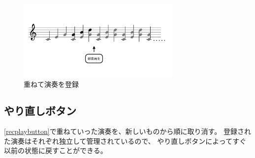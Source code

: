\begin{figure}[tb]
\includegraphics[width=8cm,bb=0 0 1054 481]{images/rp3.png}
\centering
\caption{重ねて演奏を登録}
\label{recplay3}
\end{figure}

\subsection{やり直しボタン}

\ref{recplaybutton}で重ねていった演奏を、新しいものから順に取り消す。
登録された演奏はそれぞれ独立して管理されているので、
やり直しボタンによってすぐ以前の状態に戻すことができる。
